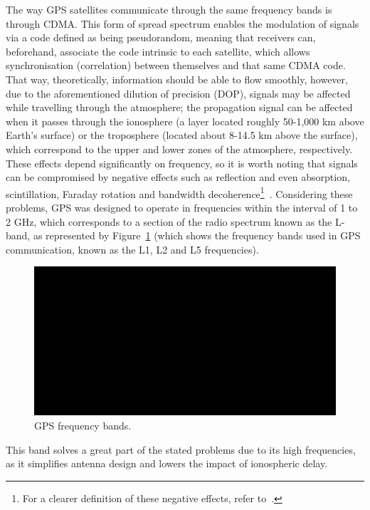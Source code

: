The way GPS satellites communicate through the same frequency bands is through CDMA. This form of spread spectrum enables the modulation of signals via a code defined as being pseudorandom, meaning that receivers can, beforehand, associate the code intrinsic to each satellite, which allows synchronisation (correlation) between themselves and that same CDMA code. That way, theoretically, information should be able to flow smoothly, however, due to the aforementioned dilution of precision (DOP), signals may be affected while travelling through the atmosphere;
the propagation signal can be affected when it passes through the ionosphere (a layer located roughly 50-1,000 km above Earth's surface) or the troposphere (located about 8-14.5 km above the surface), which correspond to the upper and lower zones of the atmosphere, respectively. These effects depend significantly on frequency, so it is worth noting that signals can be compromised by negative effects such as reflection and even absorption, scintillation, Faraday rotation and bandwidth decoherence\footnote{For a clearer definition of these negative effects, refer to~\cite{ieee_terms_1997}.}~\cite{au_gov_satell}. Considering these problems, GPS was designed to operate in frequencies within the interval of 1 to 2 GHz, which corresponds to a section of the radio spectrum known as the L-band, as represented by Figure~\ref{fig:gps_bands} (which shows the frequency bands used in GPS communication, known as the L1, L2 and L5 frequencies).
\begin{figure}[ht]
	\centering
	\includegraphics[width=1.0\textwidth]{Chapters/Figures/demo.png}
	\caption{GPS frequency bands.}
	\label{fig:gps_bands}
\end{figure}

This band solves a great part of the stated problems due to its high frequencies, as it simplifies antenna design and lowers the impact of ionospheric delay.

